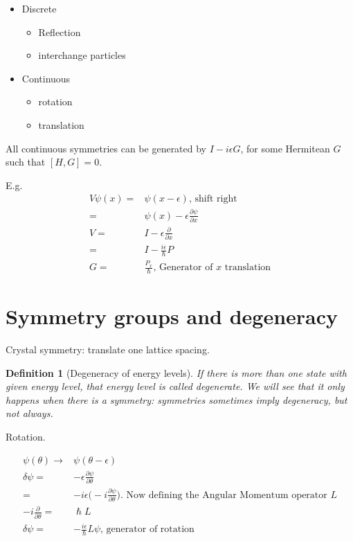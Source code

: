 \documentclass[]{article}
\newtheorem{defn}[thm]{Definition}
\begin{document}
\begin{itemize}
	\item Discrete
	\begin{itemize}
		\item Reflection
		\item interchange particles
	\end{itemize}
	\item Continuous
	\begin{itemize}
		\item rotation
		\item translation
	\end{itemize}
\end{itemize}

All continuous symmetries can be generated by $I-i \epsilon G$, for some Hermitean $G$ such that $[H,G]=0$.

E.g.
\begin{align*}
V \psi(x) = & \psi(x-\epsilon)\text{, shift right}\\
=& \psi(x) - \epsilon \frac{\partial \psi}{\partial x}\\
V =& I -  \epsilon \frac{\partial }{\partial x}\\
=& I - \frac{i \epsilon}{\hslash}P\\
G =& \frac{P_x}{\hslash}\text{, Generator of $x$ translation}
\end{align*}


\section{Symmetry groups and degeneracy}

Crystal symmetry: translate one lattice spacing.

\begin{defn}[Degeneracy of energy levels]
	If there is more than one state with given energy level, that energy level is called degenerate. We will see that it only happens when there is a symmetry: symmetries sometimes imply degeneracy, but not always.
\end{defn}
 
Rotation.

\begin{align*}
\psi(\theta) \rightarrow & \psi(\theta - \epsilon)\\
\delta\psi =& - \epsilon \frac{\partial \psi}{\partial \theta}\\
=& -i \epsilon \big(-i \frac{\partial \psi}{\partial \theta}\big).\text{ Now defining the Angular Momentum operator $L$}\\
- i \frac{\partial}{\partial \theta} =&\hslash L \\
\delta\psi =& - \frac{i \epsilon}{\hslash} L \psi \text{, generator of rotation}
\end{align*}
\end{document}
